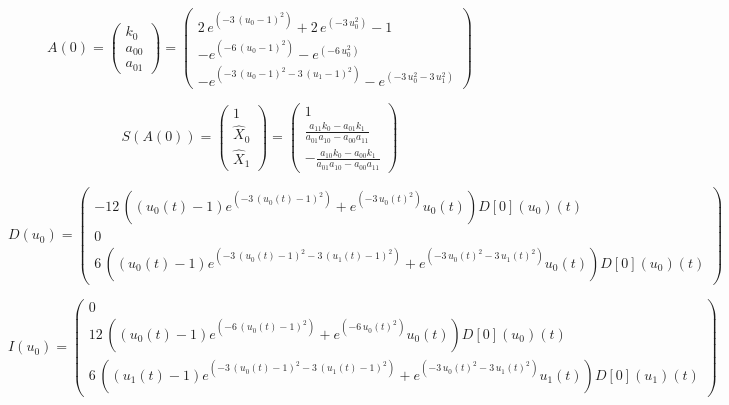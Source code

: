 \documentclass{article}
\begin{document}
\[
  A\left(0\right) = \left(\begin{array}{r}
k_{0} \\
{a}_{00} \\
{a}_{01}
\end{array}\right) = \left(\begin{array}{r}
2 \, e^{\left(-3 \, {\left(u_{0} - 1\right)}^{2}\right)} + 2 \, e^{\left(-3 \, u_{0}^{2}\right)} - 1 \\
-e^{\left(-6 \, {\left(u_{0} - 1\right)}^{2}\right)} - e^{\left(-6 \, u_{0}^{2}\right)} \\
-e^{\left(-3 \, {\left(u_{0} - 1\right)}^{2} - 3 \, {\left(u_{1} - 1\right)}^{2}\right)} - e^{\left(-3 \, u_{0}^{2} - 3 \, u_{1}^{2}\right)}
\end{array}\right)
\]

\[
  S\left(A\left(0\right)\right) = \left(\begin{array}{r}
1 \\
\hat{X}_{0} \\
\hat{X}_{1}
\end{array}\right) = \left(\begin{array}{r}
1 \\
\frac{{a}_{11} k_{0} - {a}_{01} k_{1}}{{a}_{01} {a}_{10} - {a}_{00} {a}_{11}} \\
-\frac{{a}_{10} k_{0} - {a}_{00} k_{1}}{{a}_{01} {a}_{10} - {a}_{00} {a}_{11}}
\end{array}\right)
\]

\[
  D(u_0) = \left(\begin{array}{r}
-12 \, {\left({\left(u_{0}\left(t\right) - 1\right)} e^{\left(-3 \, {\left(u_{0}\left(t\right) - 1\right)}^{2}\right)} + e^{\left(-3 \, u_{0}\left(t\right)^{2}\right)} u_{0}\left(t\right)\right)} D[0]\left(u_{0}\right)\left(t\right) \\
0 \\
6 \, {\left({\left(u_{0}\left(t\right) - 1\right)} e^{\left(-3 \, {\left(u_{0}\left(t\right) - 1\right)}^{2} - 3 \, {\left(u_{1}\left(t\right) - 1\right)}^{2}\right)} + e^{\left(-3 \, u_{0}\left(t\right)^{2} - 3 \, u_{1}\left(t\right)^{2}\right)} u_{0}\left(t\right)\right)} D[0]\left(u_{0}\right)\left(t\right)
\end{array}\right)
\]

\[
  I(u_0) = \left(\begin{array}{r}
0 \\
12 \, {\left({\left(u_{0}\left(t\right) - 1\right)} e^{\left(-6 \, {\left(u_{0}\left(t\right) - 1\right)}^{2}\right)} + e^{\left(-6 \, u_{0}\left(t\right)^{2}\right)} u_{0}\left(t\right)\right)} D[0]\left(u_{0}\right)\left(t\right) \\
6 \, {\left({\left(u_{1}\left(t\right) - 1\right)} e^{\left(-3 \, {\left(u_{0}\left(t\right) - 1\right)}^{2} - 3 \, {\left(u_{1}\left(t\right) - 1\right)}^{2}\right)} + e^{\left(-3 \, u_{0}\left(t\right)^{2} - 3 \, u_{1}\left(t\right)^{2}\right)} u_{1}\left(t\right)\right)} D[0]\left(u_{1}\right)\left(t\right)
\end{array}\right)
\]
\end{document}
